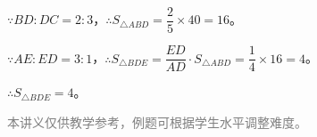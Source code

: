 \documentclass[12pt, a4paper]{ctexart}
\begin{document}
\begin{knowledgebox}[第 8 题 参考答案]
\(\because BD:DC = 2:3\)，\(\therefore S_{\triangle ABD} = \dfrac{2}{5} \times 40 = 16\)。

\(\because AE:ED = 3:1\)，\(\therefore S_{\triangle BDE} = \dfrac{ED}{AD} \cdot S_{\triangle ABD} = \dfrac{1}{4} \times 16 = 4\)。

\(\therefore S_{\triangle BDE} = 4\)。
\end{knowledgebox}

\vfill
\begin{center}
\small\textcolor{gray}{本讲义仅供教学参考，例题可根据学生水平调整难度。}
\end{center}
\end{document}

